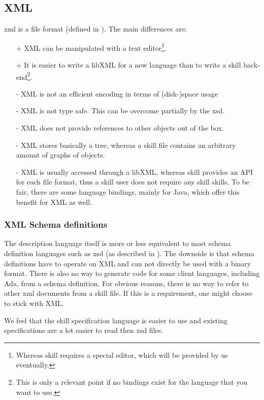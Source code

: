 \subsection*{XML}

\gls{xml} is a file format (defined in \cite{xml11}). The main differences are:
\begin{itemize}
 \item[+] XML can be manipulated with a text editor\footnote{Whereas skill requires a special editor, which will be provided by us eventually.}.
 \item[+] It is easier to write a libXML for a new language than to write a \gls{skill} back-end\footnote{This is only a relevant point if no bindings exist for the language that you want to use.}.
 \item[-] XML is not an efficient encoding in terms of (disk-)space usage
 \item[-] XML is not type safe. This can be overcome partially by the \gls{xsd}.
 \item[-] XML does not provide references to other objects out of the box.
 \item[-] XML stores basically a tree, whereas a skill file contains an arbitrary amount of graphs of objects.
 \item[-] XML is usually accessed through a libXML, whereas \gls{skill} provides an API for each file format, thus a skill user does not require any \gls{skill} skills. To be fair, there are some language bindings, mainly for Java, which offer this benefit for XML as well.
\end{itemize}

\subsubsection*{XML Schema definitions}

The description language itself is more or less equivalent to most schema definition languages such as \gls{xsd} (as described in \cite{xsd11-1,xsd11-2}). The downside is that schema definitions have to operate on XML and can not directly be used with a binary format. There is also
no way to generate code for some client languages, including Ada, from a schema definition. For obvious reasons, there is no way to refer to other \gls{xml} documents from a \gls{skill} file. If this is a requirement, one might choose to stick with XML.

We feel that the \gls{skill} specification language is easier to use and existing specifications are a lot easier to read then \gls{xsd} files.

